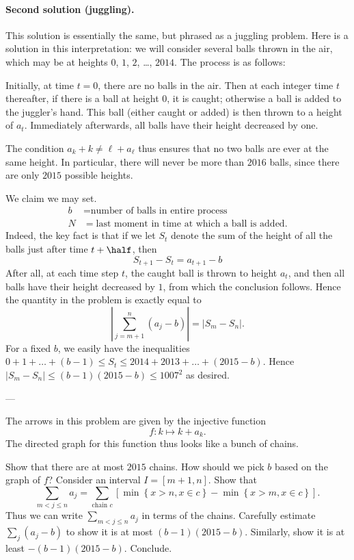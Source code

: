 \paragraph{Second solution (juggling).}
This solution is essentially the same, but phrased as a juggling problem.
Here is a solution in this interpretation:
we will consider several balls thrown in the air,
which may be at heights $0$, $1$, $2$, \dots, $2014$.
The process is as follows:
\begin{itemize}
\ii Initially, at time $t = 0$, there are no balls in the air.
\ii Then at each integer time $t$ thereafter,
if there is a ball at height $0$, it is caught;
otherwise a ball is added to the juggler's hand.
This ball (either caught or added) is then thrown to a height of $a_t$.
\ii Immediately afterwards, all balls have their height decreased by one.
\end{itemize}
The condition $a_k + k \neq \ell + a_\ell$ thus ensures that
no two balls are ever at the same height.
In particular, there will never be more than $2016$ balls,
since there are only $2015$ possible heights.

We claim we may set.
\begin{align*}
  b &= \text{number of balls in entire process} \\
  N &= \text{last moment in time at which a ball is added}.
\end{align*}
Indeed, the key fact is that if we let $S_t$ denote
the sum of the height of all the balls just after time $t+\half$, then
\[ S_{t+1} - S_t = a_{t+1} - b \]
After all, at each time step $t$, the caught ball is thrown to height $a_t$,
and then all balls have their height decreased by $1$,
from which the conclusion follows.
Hence the quantity in the problem is exactly equal to
\[ \left\lvert\sum_{j=m+1}^n (a_j-b) \right\rvert
  = \left\lvert S_m - S_n \right\rvert. \]
For a fixed $b$, we easily have the inequalities
$0 + 1 + \dots + (b-1) \le S_t \le 2014 + 2013 + \dots + (2015-b)$.
Hence $|S_m - S_n| \le (b-1)(2015-b) \le 1007^2$ as desired.

---

The arrows in this problem are given by the injective function
\[ f \colon k \mapsto k + a_k. \]
The directed graph for this function thus looks like a bunch of chains.
\begin{walk}
  \ii Show that there are at most $2015$ chains.
  \ii How should we pick $b$ based on the graph of $f$?
  \ii Consider an interval $I = [m+1,n]$.
  Show that
  \[ \sum_{m<j\le n} a_j
    = \sum_{\text{chain } c} \left[ \min \left\{ x > n, x \in c \right\}
    - \min \left\{ x > m, x \in c \right\} \right]. \]
  Thus we can write $\sum_{m < j \le n} a_j$ in terms of the chains.
  \ii Carefully estimate $\sum_j (a_j-b)$ to show it is at most $(b-1)(2015-b)$.
  \ii Similarly, show it is at least $-(b-1)(2015-b)$. Conclude.
\end{walk}
